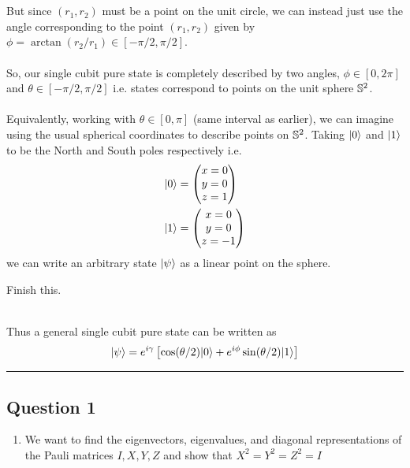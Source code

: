 \documentclass[11pt]{article}
\begin{document}
\\
\\
But since $(r_1, r_2)$ must be a point on the unit circle, we can instead just use the angle corresponding to the point $(r_1, r_2)$ given by $\phi = \arctan(r_2/r_1) \in [-\pi/2, \pi/2]$.
\\
\\
So, our single cubit pure state is completely described by two angles, $\phi \in [0, 2\pi]$ and $\theta \in [-\pi/2, \pi/2]$ i.e. states correspond to points on the unit sphere $\mathbb{S}^2$.
\\
\\
Equivalently, working with $\theta \in [0, \pi]$ (same interval as earlier), we can imagine using the usual spherical coordinates to describe points on $\mathbb{S}^2$. Taking $\lvert0\rangle$ and $\lvert1\rangle$ to be the North and South poles respectively i.e. \begin{align*}
  \lvert0\rangle &= \begin{pmatrix}
    x = 0 \\ y = 0 \\ z = 1
  \end{pmatrix} \\
  \lvert1\rangle &= \begin{pmatrix}
    x = 0 \\ y = 0 \\ z = -1
  \end{pmatrix}
\end{align*} we can write an arbitrary state $\lvert\psi\rangle$ as a linear point on the sphere.
\\
\begin{note}
  {Finish this.}
\end{note}
\\
Thus a general single cubit pure state can be written as $$ \lvert\psi\rangle = e^{i\gamma} \left[ \cos(\theta/2) \lvert0\rangle + e^{i\phi} \sin(\theta/2) \lvert1\rangle \right] $$


\vskip 1cm
\hrule
\pagebreak


\subsection*{Question 1}

\begin{enumerate}
  \item We want to find the eigenvectors, eigenvalues, and diagonal representations of the Pauli matrices $I, X, Y, Z$ and show that $X^2 = Y^2 = Z^2 = I$
\end{enumerate}
\end{document}

